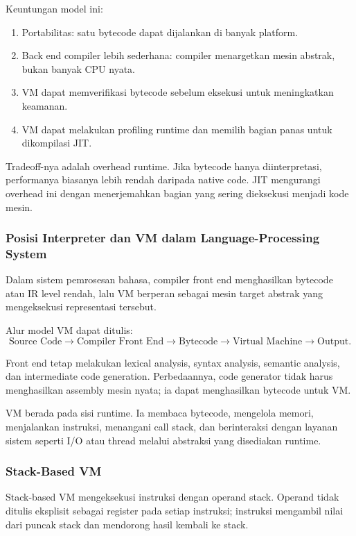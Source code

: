 Keuntungan model ini:
\begin{enumerate}
    \item Portabilitas: satu bytecode dapat dijalankan di banyak platform.
    \item Back end compiler lebih sederhana: compiler menargetkan mesin abstrak, bukan banyak CPU nyata.
    \item VM dapat memverifikasi bytecode sebelum eksekusi untuk meningkatkan keamanan.
    \item VM dapat melakukan profiling runtime dan memilih bagian panas untuk dikompilasi JIT.
\end{enumerate}

Tradeoff-nya adalah overhead runtime. Jika bytecode hanya diinterpretasi, performanya biasanya lebih rendah daripada native code. JIT mengurangi overhead ini dengan menerjemahkan bagian yang sering dieksekusi menjadi kode mesin.

\subsubsection{Posisi Interpreter dan VM dalam Language-Processing System}

\begin{jawab}
Dalam sistem pemrosesan bahasa, compiler front end menghasilkan bytecode atau IR level rendah, lalu VM berperan sebagai mesin target abstrak yang mengeksekusi representasi tersebut.
\end{jawab}

Alur model VM dapat ditulis:
\[
    \text{Source Code}
    \rightarrow \text{Compiler Front End}
    \rightarrow \text{Bytecode}
    \rightarrow \text{Virtual Machine}
    \rightarrow \text{Output}.
\]

Front end tetap melakukan lexical analysis, syntax analysis, semantic analysis, dan intermediate code generation. Perbedaannya, code generator tidak harus menghasilkan assembly mesin nyata; ia dapat menghasilkan bytecode untuk VM.

VM berada pada sisi runtime. Ia membaca bytecode, mengelola memori, menjalankan instruksi, menangani call stack, dan berinteraksi dengan layanan sistem seperti I/O atau thread melalui abstraksi yang disediakan runtime.

\subsubsection{Stack-Based VM}

\begin{jawab}
Stack-based VM mengeksekusi instruksi dengan operand stack. Operand tidak ditulis eksplisit sebagai register pada setiap instruksi; instruksi mengambil nilai dari puncak stack dan mendorong hasil kembali ke stack.
\end{jawab}

